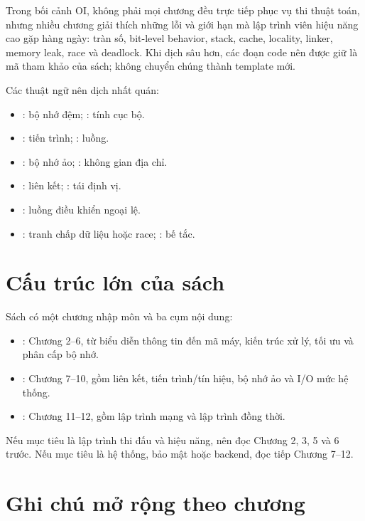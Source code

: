 \documentclass[11pt]{article}
\begin{document}
Trong bối cảnh OI, không phải mọi chương đều trực tiếp phục vụ thi thuật toán,
nhưng nhiều chương giải thích những lỗi và giới hạn mà lập trình viên hiệu năng
cao gặp hàng ngày: tràn số, bit-level behavior, stack, cache, locality, linker,
memory leak, race và deadlock. Khi dịch sâu hơn, các đoạn code nên được giữ là
mã tham khảo của sách; không chuyển chúng thành template mới.

Các thuật ngữ nên dịch nhất quán:
\begin{itemize}
  \item {}: bộ nhớ đệm; : tính cục bộ.
  \item {}: tiến trình; : luồng.
  \item {}: bộ nhớ ảo; : không gian địa
        chỉ.
  \item {}: liên kết; : tái định vị.
  \item {}: luồng điều khiển ngoại lệ.
  \item {}: tranh chấp dữ liệu hoặc race; : bế tắc.
\end{itemize}

\section{Cấu trúc lớn của sách}

Sách có một chương nhập môn và ba cụm nội dung:
\begin{itemize}
  \item {}: Chương 2--6, từ biểu diễn
        thông tin đến mã máy, kiến trúc xử lý, tối ưu và phân cấp bộ nhớ.
  \item {}: Chương 7--10, gồm liên kết,
        tiến trình/tín hiệu, bộ nhớ ảo và I/O mức hệ thống.
  \item {}: Chương 11--12, gồm lập trình mạng và
        lập trình đồng thời.
\end{itemize}

Nếu mục tiêu là lập trình thi đấu và hiệu năng, nên đọc Chương 2, 3, 5 và 6
trước. Nếu mục tiêu là hệ thống, bảo mật hoặc backend, đọc tiếp Chương 7--12.

\section{Ghi chú mở rộng theo chương}
\end{document}

